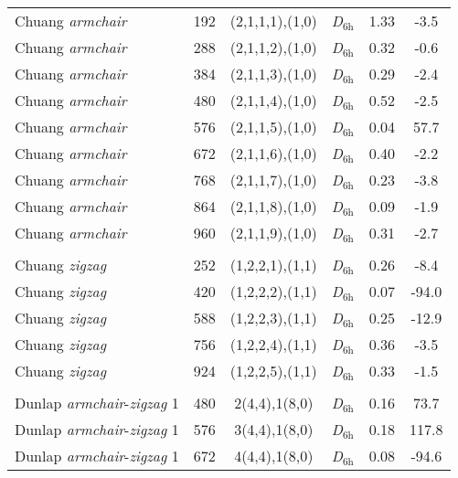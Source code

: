 \begin{table}[htbp!]
{\begin{tabular}{lccccc}
    Chuang \textit{armchair}& 192   & (2,1,1,1),(1,0) & \textit{D}$_{6\text{h}}$   & 1.33  & -3.5 \\
    Chuang \textit{armchair}& 288   & (2,1,1,2),(1,0) & \textit{D}$_{6\text{h}}$   & 0.32  & -0.6 \\
    Chuang \textit{armchair}& 384   & (2,1,1,3),(1,0) & \textit{D}$_{6\text{h}}$   & 0.29  & -2.4 \\
    Chuang \textit{armchair}& 480   & (2,1,1,4),(1,0) & \textit{D}$_{6\text{h}}$   & 0.52  & -2.5 \\
    Chuang \textit{armchair}& 576   & (2,1,1,5),(1,0) & \textit{D}$_{6\text{h}}$   & 0.04  & 57.7 \\
    Chuang \textit{armchair}& 672   & (2,1,1,6),(1,0) & \textit{D}$_{6\text{h}}$   & 0.40  & -2.2 \\
    Chuang \textit{armchair}& 768   & (2,1,1,7),(1,0) & \textit{D}$_{6\text{h}}$   & 0.23  & -3.8 \\
    Chuang \textit{armchair}& 864   & (2,1,1,8),(1,0) & \textit{D}$_{6\text{h}}$   & 0.09  & -1.9 \\
    Chuang \textit{armchair}& 960   & (2,1,1,9),(1,0) & \textit{D}$_{6\text{h}}$   & 0.31  & -2.7 \\
          &       &       &       &       &  \\
    Chuang \textit{zigzag} & 252   & (1,2,2,1),(1,1) & \textit{D}$_{6\text{h}}$   & 0.26  & -8.4 \\
    Chuang \textit{zigzag} & 420   & (1,2,2,2),(1,1) & \textit{D}$_{6\text{h}}$   & 0.07  & -94.0 \\
    Chuang \textit{zigzag} & 588   & (1,2,2,3),(1,1) & \textit{D}$_{6\text{h}}$   & 0.25  & -12.9 \\
    Chuang \textit{zigzag} & 756   & (1,2,2,4),(1,1) & \textit{D}$_{6\text{h}}$   & 0.36  & -3.5 \\
    Chuang \textit{zigzag} & 924   & (1,2,2,5),(1,1) & \textit{D}$_{6\text{h}}$   & 0.33  & -1.5 \\
          &       &       &       &       &  \\
    Dunlap \textit{armchair}-\textit{zigzag} 1& 480   & 2(4,4),1(8,0) & \textit{D}$_{6\text{h}}$   & 0.16  & 73.7 \\
    Dunlap \textit{armchair}-\textit{zigzag} 1& 576   & 3(4,4),1(8,0) & \textit{D}$_{6\text{h}}$   & 0.18  & 117.8 \\
    Dunlap \textit{armchair}-\textit{zigzag} 1& 672   & 4(4,4),1(8,0) & \textit{D}$_{6\text{h}}$   & 0.08  & -94.6 \\

\end{tabular}}
\end{table}
